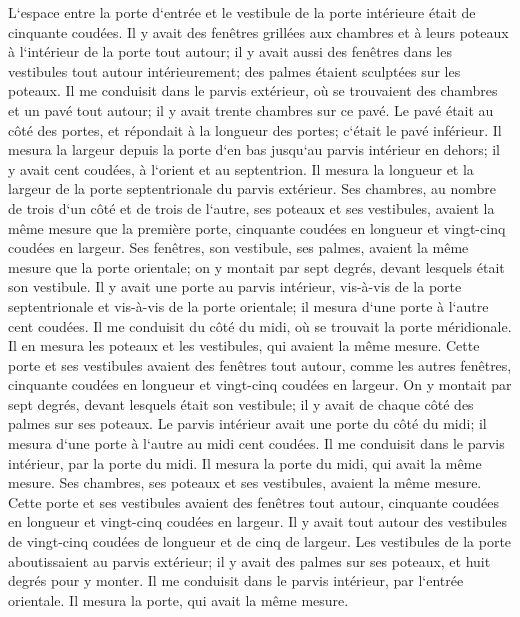 \verse L`espace entre la porte d`entrée et le vestibule de la porte intérieure était de cinquante coudées. 
\verse Il y avait des fenêtres grillées aux chambres et à leurs poteaux à l`intérieur de la porte tout autour; il y avait aussi des fenêtres dans les vestibules tout autour intérieurement; des palmes étaient sculptées sur les poteaux. 
\verse Il me conduisit dans le parvis extérieur, où se trouvaient des chambres et un pavé tout autour; il y avait trente chambres sur ce pavé. 
\verse Le pavé était au côté des portes, et répondait à la longueur des portes; c`était le pavé inférieur. 
\verse Il mesura la largeur depuis la porte d`en bas jusqu`au parvis intérieur en dehors; il y avait cent coudées, à l`orient et au septentrion. 
\verse Il mesura la longueur et la largeur de la porte septentrionale du parvis extérieur. 
\verse Ses chambres, au nombre de trois d`un côté et de trois de l`autre, ses poteaux et ses vestibules, avaient la même mesure que la première porte, cinquante coudées en longueur et vingt-cinq coudées en largeur. 
\verse Ses fenêtres, son vestibule, ses palmes, avaient la même mesure que la porte orientale; on y montait par sept degrés, devant lesquels était son vestibule. 
\verse Il y avait une porte au parvis intérieur, vis-à-vis de la porte septentrionale et vis-à-vis de la porte orientale; il mesura d`une porte à l`autre cent coudées. 
\verse Il me conduisit du côté du midi, où se trouvait la porte méridionale. Il en mesura les poteaux et les vestibules, qui avaient la même mesure. 
\verse Cette porte et ses vestibules avaient des fenêtres tout autour, comme les autres fenêtres, cinquante coudées en longueur et vingt-cinq coudées en largeur. 
\verse On y montait par sept degrés, devant lesquels était son vestibule; il y avait de chaque côté des palmes sur ses poteaux. 
\verse Le parvis intérieur avait une porte du côté du midi; il mesura d`une porte à l`autre au midi cent coudées. 
\verse Il me conduisit dans le parvis intérieur, par la porte du midi. Il mesura la porte du midi, qui avait la même mesure. 
\verse Ses chambres, ses poteaux et ses vestibules, avaient la même mesure. Cette porte et ses vestibules avaient des fenêtres tout autour, cinquante coudées en longueur et vingt-cinq coudées en largeur. 
\verse Il y avait tout autour des vestibules de vingt-cinq coudées de longueur et de cinq de largeur. 
\verse Les vestibules de la porte aboutissaient au parvis extérieur; il y avait des palmes sur ses poteaux, et huit degrés pour y monter. 
\verse Il me conduisit dans le parvis intérieur, par l`entrée orientale. Il mesura la porte, qui avait la même mesure. 
